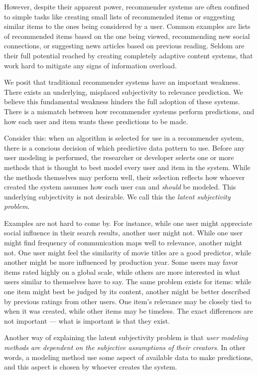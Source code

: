 However, despite their apparent power, recommender systems are often confined
to simple tasks like creating small lists of recommended items
or suggesting similar items to the ones being considered by a user.
Common examples are lists of recommended items based on the one being viewed, 
recommending new social connections, or suggesting news articles based on previous reading.
Seldom are their full potential reached by creating completely adaptive
content systems, that work hard to mitigate any signs of information overload.

We posit that traditional recommender systems have an important weakness.
There exists an underlying, misplaced subjectivity to relevance prediction.
We believe this fundamental weakness hinders the full adoption of these systems.
There is a mismatch between how recommender systems perform predictions,
and how each user and item wants these predictions to be made.



Consider this: 
when an algorithm is selected for use in a recommender system,
there is a concious decision of which predictive data pattern to use.
Before any user modeling is performed, the researcher or developer selects
one or more methods that is thought to best model every user and item in the system.
While the methods themselves may perform well, their selection
reflects how whoever created the system assumes how each user
can and \emph{should} be modeled. This underlying subjectivity is not desirable.
We call this the \emph{latent subjectivity problem}.

Examples are not hard to come by.
For instance, while one user might appreciate social
influence in their search results, another user might not.
While one user might find frequency of communication maps well to relevance,
another might not. 
One user might feel the similarity of movie titles are a good predictor,
while another might be more influenced by production year.
Some users may favor items rated highly on a global scale,
while others are more interested in what users similar to themselves have to say.
The same problem exists for items: while one item might best be judged by its content,
another might be better described by previous ratings from other users.
One item's relevance may be closely tied to when it was created,
while other items may be timeless.
The exact differences are not important --- what is important is that they exist.

Another way of explaining the latent subjectivity problem is that 
\emph{user modeling methods are dependent on the subjective assumptions of their creators}.
In other words, a modeling method use some aspect of available data to make predictions,
and this aspect is chosen by whoever creates the system.

